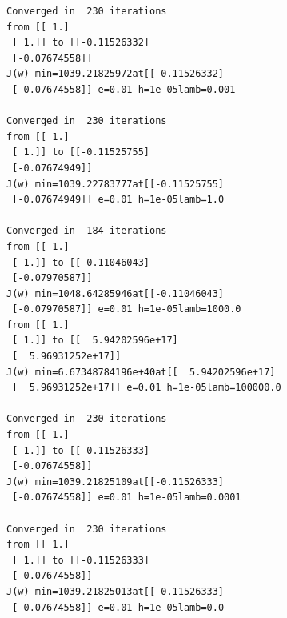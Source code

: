 \begin{itemize}
\begin{verbatim}
Converged in  230 iterations
from [[ 1.]
 [ 1.]] to [[-0.11526332]
 [-0.07674558]]
J(w) min=1039.21825972at[[-0.11526332]
 [-0.07674558]] e=0.01 h=1e-05lamb=0.001

Converged in  230 iterations
from [[ 1.]
 [ 1.]] to [[-0.11525755]
 [-0.07674949]]
J(w) min=1039.22783777at[[-0.11525755]
 [-0.07674949]] e=0.01 h=1e-05lamb=1.0

Converged in  184 iterations
from [[ 1.]
 [ 1.]] to [[-0.11046043]
 [-0.07970587]]
J(w) min=1048.64285946at[[-0.11046043]
 [-0.07970587]] e=0.01 h=1e-05lamb=1000.0
from [[ 1.]
 [ 1.]] to [[  5.94202596e+17]
 [  5.96931252e+17]]
J(w) min=6.67348784196e+40at[[  5.94202596e+17]
 [  5.96931252e+17]] e=0.01 h=1e-05lamb=100000.0

Converged in  230 iterations
from [[ 1.]
 [ 1.]] to [[-0.11526333]
 [-0.07674558]]
J(w) min=1039.21825109at[[-0.11526333]
 [-0.07674558]] e=0.01 h=1e-05lamb=0.0001

Converged in  230 iterations
from [[ 1.]
 [ 1.]] to [[-0.11526333]
 [-0.07674558]]
J(w) min=1039.21825013at[[-0.11526333]
 [-0.07674558]] e=0.01 h=1e-05lamb=0.0
\end{verbatim}



\end{itemize}
